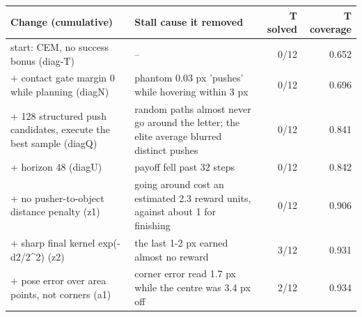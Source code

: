 
\begin{tabular}{p{6.2cm}p{6.2cm}rr}
\toprule
Change (cumulative) & Stall cause it removed & T solved & T coverage \\
\midrule
start: CEM, no success bonus (diag-T) & -- & 0/12 & 0.652 \\
+ contact gate margin 0 while planning (diagN) & phantom 0.03 px 'pushes' while hovering within 3 px & 0/12 & 0.696 \\
+ 128 structured push candidates, execute the best sample (diagQ) & random paths almost never go around the letter; the elite average blurred distinct pushes & 0/12 & 0.841 \\
+ horizon 48 (diagU) & payoff fell past 32 steps & 0/12 & 0.842 \\
+ no pusher-to-object distance penalty (z1) & going around cost an estimated 2.3 reward units, against about 1 for finishing & 0/12 & 0.906 \\
+ sharp final kernel exp(-d2/2^2) (z2) & the last 1-2 px earned almost no reward & 3/12 & 0.931 \\
+ pose error over area points, not corners (a1) & corner error read 1.7 px while the centre was 3.4 px off & 2/12 & 0.934 \\
\bottomrule
\end{tabular}
